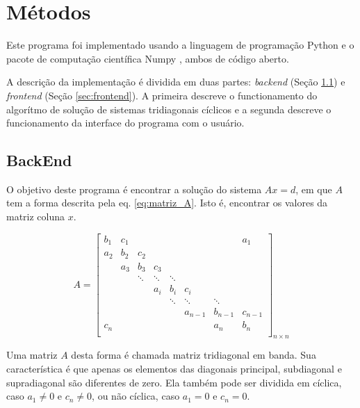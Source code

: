 \documentclass[a4,12pt]{horizon-theme}
\begin{document}
\section{Métodos}
\label{sec:metodo}

Este programa foi implementado usando a linguagem de programação Python \citep{python} e o pacote de computação científica Numpy \citep{numpy}, ambos de código aberto.

A descrição da implementação é dividida em duas partes: \emph{backend} (Seção \ref{sec:backend}) e \emph{frontend} (Seção \ref{sec:frontend}). A primeira descreve o functionamento do algorítmo de solução de sistemas tridiagonais cíclicos e a segunda descreve o funcionamento da interface do programa com o usuário.

\subsection{BackEnd}
\label{sec:backend}

O objetivo deste programa é encontrar a solução do sistema $Ax = d$, em que $A$ tem a forma descrita pela eq. \eqref{eq:matriz_A}. Isto é, encontrar os valores da matriz coluna $x$.

\begin{equation}\label{eq:matriz_A}
  A =
  \begin{bmatrix}
    b_1 & c_1 &        &        &        &         &         & a_1     \\
    a_2 & b_2 & c_2                                                    \\
        & a_3 & b_3    & c_3                                           \\
        &     & \ddots & \ddots & \ddots                               \\
        &     &        & a_i    & b_i    & c_i                         \\
        &     &        &        & \ddots & \ddots  & \ddots            \\
        &     &        &        &        & a_{n-1} & b_{n-1} & c_{n-1} \\
    c_n &     &        &        &        &         & a_n     & b_n     \\
  \end{bmatrix}_{n \times n}
\end{equation}

Uma matriz $A$ desta forma é chamada matriz tridiagonal em banda. Sua característica é que apenas os elementos das diagonais principal, subdiagonal e supradiagonal são diferentes de zero. Ela também pode ser dividida em cíclica, caso $a_1 \neq 0$ e $c_n \neq 0$, ou não cíclica, caso $a_1 = 0$ e $c_n = 0$.
\end{document}
